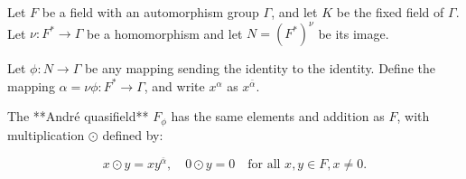 Let $F$ be a field with an automorphism group $\Gamma$, and let $K$ be the fixed field of $\Gamma$. Let $\nu: F^* \to \Gamma$ be a homomorphism and let $N = (F^*)^{\nu}$ be its image.

Let $\phi: N \to \Gamma$ be any mapping sending the identity to the identity. Define the mapping $\alpha = \nu\phi: F^* \to \Gamma$, and write $x^{\alpha}$ as $x^{\bar{\alpha}}$.

The **André quasifield** $F_{\phi}$ has the same elements and addition as $F$, with multiplication $\odot$ defined by:

$$x \odot y = xy^{\bar{\alpha}}, \quad 0 \odot y = 0 \quad \text{for all } x, y \in F, x \neq 0.$$
